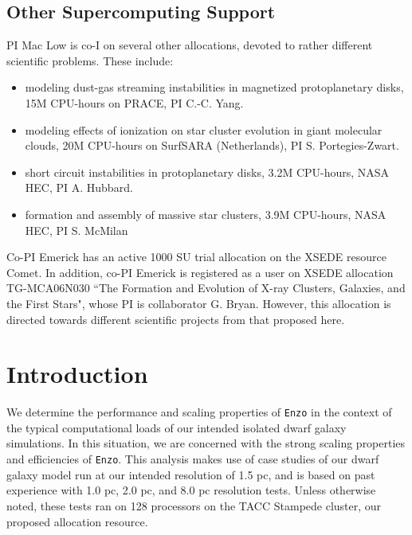 \documentclass[11pt]{article}
\begin{document}

\subsection{Other Supercomputing Support}
 
PI Mac Low is co-I on several other allocations, devoted to rather different scientific problems.  These include:
\begin{itemize}
\item modeling dust-gas streaming instabilities in magnetized protoplanetary disks, 15M CPU-hours on PRACE, PI C.-C. Yang.
\item modeling effects of ionization on star cluster evolution in giant molecular clouds, 20M CPU-hours on SurfSARA (Netherlands), PI S. Portegies-Zwart.
\item short circuit instabilities in protoplanetary disks, 3.2M CPU-hours, NASA HEC, PI A. Hubbard.
\item formation and assembly of massive star clusters, 3.9M CPU-hours, NASA HEC, PI S. McMilan
\end{itemize}

\noindent Co-PI Emerick has an active 1000 SU trial allocation on the XSEDE resource Comet. In addition, co-PI Emerick is registered as a user on XSEDE allocation TG-MCA06N030 ``The Formation and Evolution of X-ray Clusters, Galaxies, and the First Stars", whose PI is collaborator G. Bryan. However, this allocation is directed towards different scientific projects from that proposed here.
\clearpage
\appendix

\section{Introduction}

We determine the performance and scaling properties of \texttt{Enzo} in the context of the typical computational loads of our intended isolated dwarf galaxy simulations. In this situation, we are concerned with the strong scaling properties and efficiencies of \texttt{Enzo}. This analysis makes use of case studies of our dwarf galaxy model run at our intended resolution of 1.5 pc, and is based on past experience with 1.0 pc, 2.0 pc, and 8.0 pc resolution tests. Unless otherwise noted, these tests ran on 128 processors on the TACC Stampede cluster, our proposed allocation resource.
\end{document}
